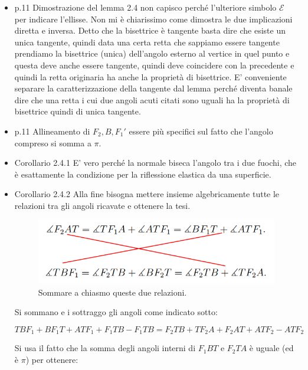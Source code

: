 \documentclass[10pt,a4paper]{article}
\begin{document}
\begin{itemize}
\item p.11 Dimostrazione del lemma 2.4 non capisco perché l'ulteriore simbolo $\mathcal{E}$ per indicare l'ellisse. Non mi è chiarissimo come dimostra le due implicazioni diretta e inversa. Detto che la bisettrice è tangente basta dire che esiste un unica tangente, quindi data una certa retta che sappiamo essere tangente prendiamo la bisettrice (unica) dell'angolo esterno al vertice in quel punto e questa deve anche essere tangente, quindi deve coincidere con la precedente e quindi la retta originaria ha anche la proprietà di bisettrice. E' conveniente separare la caratterizzazione della tangente dal lemma perché diventa banale dire che una retta i cui due angoli acuti citati sono uguali ha la proprietà di bisettrice quindi di unica tangente.

\item p.11 Allineamento di $F_2, B, F_1'$ essere più specifici sul fatto che l'angolo compreso si somma a $\pi$.

\item Corollario 2.4.1 E' vero perché la normale biseca l'angolo tra i due fuochi, che è esattamente la condizione per la riflessione elastica da una superficie.

\item Corollario 2.4.2 Alla fine bisogna mettere insieme algebricamente tutte le relazioni tra gli angoli ricavate e ottenere la tesi.

\begin{figure}[!htb]
  \centering
  \includegraphics[scale=.5]{immagine1.png}
\caption{Sommare a chiasmo queste due relazioni.}
\label{trasporto}
\end{figure}

Si sommano e i sottraggo gli angoli come indicato sotto:

\begin{equation}
T B F_1 + B F_1 T + A T F_1 + F_1 T B - F_1 T B = F_2 T B + T F_2 A + F_2 A T + A T F_2 - A T F_2
\end{equation}

Si usa il fatto che la somma degli angoli interni di $F_1 B T$ e $ F_ 2 T A$ è uguale (ed è $\pi$) per ottenere:


\end{itemize}
\end{document}
